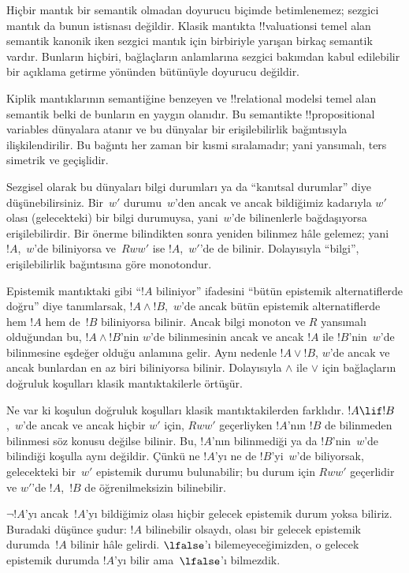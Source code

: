 \documentclass[../../../include/open-logic-section]{subfiles}
\begin{document}


Hiçbir mantık bir semantik olmadan doyurucu biçimde betimlenemez; sezgici
mantık da bunun istisnası değildir. Klasik mantıkta !!{valuation}s{}i temel alan
semantik kanonik iken sezgici mantık için birbiriyle yarışan birkaç semantik
vardır. Bunların hiçbiri, bağlaçların anlamlarına sezgici bakımdan kabul
edilebilir bir açıklama getirme yönünden bütünüyle doyurucu değildir.

Kiplik mantıklarının semantiğine benzeyen ve !!{relational model}s{}i temel alan
semantik belki de bunların en yaygın olanıdır. Bu semantikte
!!{propositional variable}s dünyalara atanır ve bu dünyalar bir erişilebilirlik
bağıntısıyla ilişkilendirilir. Bu bağıntı her zaman bir kısmi sıralamadır; yani
yansımalı, ters simetrik ve geçişlidir.

Sezgisel olarak bu dünyaları bilgi durumları ya da ``kanıtsal durumlar'' diye
düşünebilirsiniz. Bir~$w'$ durumu~$w$'den ancak ve ancak bildiğimiz kadarıyla
$w'$ olası (gelecekteki) bir bilgi durumuysa, yani~$w$'de bilinenlerle
bağdaşıyorsa erişilebilirdir. Bir önerme bilindikten sonra yeniden bilinmez
hâle gelemez; yani $!A$,~$w$'de biliniyorsa ve~$Rww'$ ise $!A$,~$w'$'de de
bilinir. Dolayısıyla ``bilgi'', erişilebilirlik bağıntısına göre monotondur.

Epistemik mantıktaki gibi ``$!A$ biliniyor'' ifadesini ``bütün epistemik
alternatiflerde doğru'' diye tanımlarsak, $!A \land !B$,~$w$'de ancak bütün
epistemik alternatiflerde hem $!A$ hem de~$!B$ biliniyorsa bilinir. Ancak bilgi
monoton ve $R$ yansımalı olduğundan bu, $!A \land !B$'nin $w$'de bilinmesinin
ancak ve ancak $!A$ ile $!B$'nin~$w$'de bilinmesine eşdeğer olduğu anlamına
gelir. Aynı nedenle
$!A \lor !B$, $w$'de ancak ve ancak bunlardan en az biri biliniyorsa bilinir.
Dolayısıyla $\land$ ile $\lor$ için bağlaçların doğruluk koşulları klasik
mantıktakilerle örtüşür.

Ne var ki koşulun doğruluk koşulları klasik mantıktakilerden farklıdır. $!A
\lif !B$,~$w$'de ancak ve ancak hiçbir $w'$ için, $Rww'$ geçerliyken $!A$'nın
$!B$ de bilinmeden bilinmesi söz konusu değilse bilinir. Bu, $!A$'nın bilinmediği ya da $!B$'nin~$w$'de
bilindiği koşulla aynı değildir. Çünkü ne $!A$'yı ne de $!B$'yi~$w$'de
biliyorsak, gelecekteki bir~$w'$ epistemik durumu bulunabilir; bu durum için
$Rww'$ geçerlidir ve $w'$'de $!A$,~$!B$ de öğrenilmeksizin bilinebilir.

$\lnot !A$'yı ancak~$!A$'yı bildiğimiz olası hiçbir gelecek epistemik durum
yoksa biliriz. Buradaki düşünce şudur: $!A$ bilinebilir olsaydı, olası bir
gelecek epistemik durumda~$!A$ bilinir hâle gelirdi. $\lfalse$'ı
bilemeyeceğimizden, o gelecek epistemik durumda $!A$'yı bilir ama~$\lfalse$'ı
bilmezdik.
\end{document}
